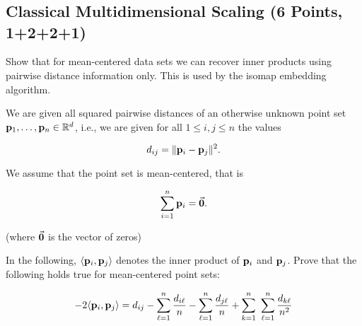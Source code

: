 \documentclass[11pt]{article}
\begin{document}
    \begin{center}
    \end{center}
    { \hspace*{\fill} \\}
    
    \begin{center}
    \end{center}
    { \hspace*{\fill} \\}
    
    \begin{center}
    \end{center}
    { \hspace*{\fill} \\}
    
    \subsection{Classical Multidimensional Scaling (6 Points,
1+2+2+1)}\label{classical-multidimensional-scaling-6-points-1221}

Show that for mean-centered data sets we can recover inner products
using pairwise distance information only. This is used by the isomap
embedding algorithm.

We are given all squared pairwise distances of an otherwise unknown
point set \({\bf p}_1,\dots, {\bf p}_n \in \mathbb{R}^d\), i.e., we are
given for all \(1 \leq i,j \leq n\) the values

\[  d_{ij} = \|{\bf p}_i - {\bf p}_j\|^2. \]

We assume that the point set is mean-centered, that is

\[ \sum_{i=1}^{n} {\bf p}_i = \vec{{\bf 0}}.\]

(where \(\vec{{\bf 0}}\) is the vector of zeros)

In the following, \(\langle {\bf p}_i , {\bf p}_j \rangle\) denotes the
inner product of \({\bf p}_i\) and \({\bf p}_j\). Prove that the
following holds true for mean-centered point sets:

\[-2 \langle {\bf p}_i , {\bf p}_j \rangle = 
d_{ij}
- \sum_{\ell=1}^{n} \frac{d_{i\ell}}{n}   
-  \sum_{\ell=1}^{n} \frac{d_{j\ell}}{n} 
+ \sum_{k=1}^{n}~ \sum_{\ell=1}^{n} \frac{d_{k\ell}}{n^2} 
\]
\end{document}
